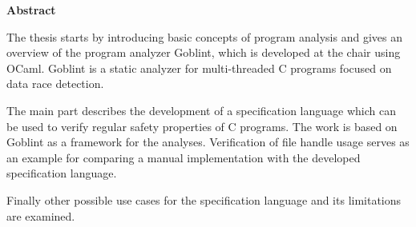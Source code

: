 \clearemptydoublepage
{}
{}

\vspace*{2cm}
\begin{center}
{\Large \bf Abstract}
\end{center}
\vspace{1cm}
The thesis starts by introducing basic concepts of program analysis and gives an overview of the program analyzer Goblint, which is developed at the chair using OCaml. Goblint is a static analyzer for multi-threaded C programs focused on data race detection.

The main part describes the development of a specification language which can be used to verify regular safety properties of C programs. The work is based on Goblint as a framework for the analyses. Verification of file handle usage serves as an example for comparing a manual implementation with the developed specification language.

Finally other possible use cases for the specification language and its limitations are examined.